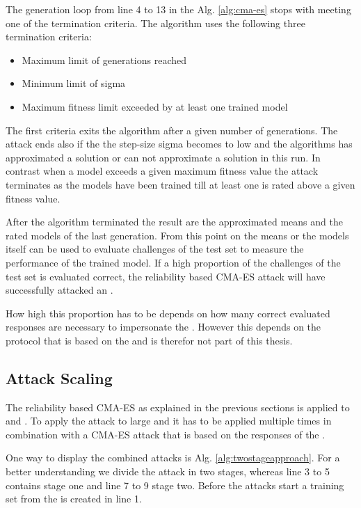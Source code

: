The generation loop from line 4 to 13 in the Alg. \ref{alg:cma-es} stops with meeting one of the termination criteria.
The algorithm uses the following three termination criteria:

\begin{itemize}
\item Maximum limit of generations reached
\item Minimum limit of sigma
\item Maximum fitness limit exceeded by at least one trained model
\end{itemize}

The first criteria exits the algorithm after a given number of generations.
The attack ends also if the the step-size sigma becomes to low and the algorithms has approximated a solution or can not approximate a solution in this run. %
In contrast when a model exceeds a given maximum fitness value the attack terminates as the models have been trained till at least one is rated above a given fitness value.

After the algorithm terminated the result are the approximated means and the rated models of the last generation.
From this point on the means or the models itself can be used to evaluate challenges of the test set to measure the performance of the trained model. 
If a high proportion of the challenges of the test set is evaluated correct, the reliability based \ac{CMA-ES} attack will have successfully attacked an \apuf. %

How high this proportion has to be depends on how many correct evaluated responses are necessary to impersonate the \puf.
However this depends on the protocol that is based on the \puf and is therefor not part of this thesis.


\subsection{Attack Scaling}
\label{sec:attackscaling}

The reliability based \ac{CMA-ES} as explained in the previous sections is applied to \apufs and \mpuf.
To apply the attack to large \xpufs and \mxpuf it has to be applied multiple times in combination with a \ac{CMA-ES} attack that is based on the responses of the \puf \cite{Becker2015ThePUFs}.

One way to display the combined attacks is Alg. \ref{alg:twostageapproach}.
For a better understanding we divide the attack in two stages, whereas line 3 to 5 contains stage one and line 7 to 9 stage two.
Before the attacks start a training set from the \xpuf is created in line 1.

